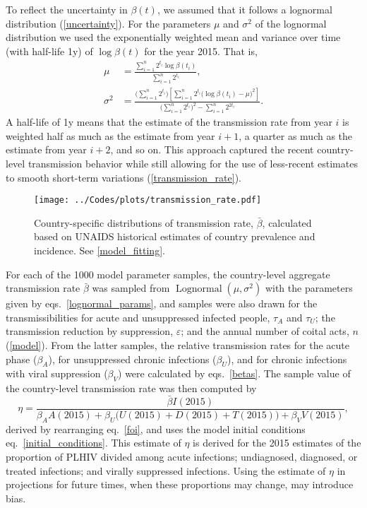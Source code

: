 \documentclass{article}
\DeclareMathOperator{\Lognormal}{Lognormal}
\begin{document}
To reflect the uncertainty in $\beta(t)$, we assumed that it follows a
lognormal distribution (\autoref{uncertainty}). For the parameters
$\mu$ and $\sigma^2$ of the lognormal distribution we used the
exponentially weighted mean and variance \autocite{holt2004} over time
(with half-life 1\;y) of $\log \beta(t)$ for the year 2015.  That is,
\begin{equation}
  \label{lognormal_params}
  \begin{split}
    \mu &= \frac{\sum_{i = 1}^n  2^{t_i}
      \log \beta(t_i)}
    {\sum_{i = 1}^n 2^{t_i}},
    \\
    \sigma^2 &= \frac{\big(\sum_{i = 1}^n 2^{t_i}\big)
      \left[\sum_{i = 1}^n  2^{t_i}
        \big(\log \beta(t_i) - \mu\big)^2\right]}
    {\big(\sum_{i = 1}^n 2^{t_i}\big)^2
      - \sum_{i = 1}^n 2^{2 t_i}}.
  \end{split}
\end{equation}
A half-life of 1\;y means that the estimate of the transmission rate
from year $i$ is weighted half as much as the estimate from year
$i + 1$, a quarter as much as the estimate from year $i + 2$, and so
on.  This approach captured the recent country-level transmission
behavior while still allowing for the use of less-recent estimates to
smooth short-term variations (\autoref{transmission_rate}).

\begin{figure}
  \centering
  \texttt{[image: ../Codes/plots/transmission\_rate.pdf]}
  \caption{Country-specific distributions of transmission rate,
    $\bar{\beta}$, calculated based on UNAIDS historical estimates of
    country prevalence and incidence.  See \autoref{model_fitting}.}
  \label{transmission_rate}
\end{figure}

For each of the 1000 model parameter samples, the country-level
aggregate transmission rate $\bar{\beta}$ was sampled from
$\Lognormal(\mu, \sigma^2)$ with the parameters given by
eqs.~\eqref{lognormal_params}, and samples were also drawn for the
transmissibilities for acute and unsuppressed infected people,
$\tau_A$ and $\tau_U$; the transmission reduction by suppression,
$\varepsilon$; and the annual number of coital acts, $n$
(\autoref{model}).  From the latter samples, the relative transmission
rates for the acute phase ($\beta_A$), for unsuppressed chronic
infections ($\beta_U$), and for chronic infections with viral
suppression ($\beta_V$) were calculated by eqs.~\eqref{betas}.  The
sample value of the country-level transmission rate was then computed
by
\begin{equation}
  \label{eta}
  \eta = \frac{\bar{\beta} I(2015)}{
    \beta_A A(2015) + \beta_U \big(U(2015) + D(2015) + T(2015)\big)
    + \beta_V V(2015)},
\end{equation}
derived by rearranging eq.~\eqref{foi}, and uses the model initial
conditions eq.~\eqref{initial_conditions}.  This estimate of $\eta$ is
derived for the 2015 estimates of the proportion of PLHIV divided
among acute infections; undiagnosed, diagnosed, or treated infections;
and virally suppressed infections.  Using the estimate of $\eta$ in
projections for future times, when these proportions may change, may
introduce bias.
\end{document}
